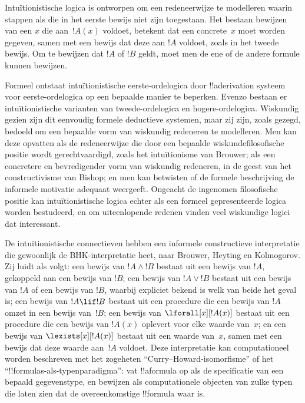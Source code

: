 \documentclass[../../../include/open-logic-section]{subfiles}
\begin{document}
Intuïtionistische logica is ontworpen om een redeneerwijze te modelleren waarin
stappen als die in het eerste bewijs niet zijn toegestaan. Het bestaan bewijzen
van een $x$ die aan~$!A(x)$ voldoet, betekent dat een concrete~$x$ moet worden
gegeven, samen met een bewijs dat deze aan $!A$ voldoet, zoals in het tweede
bewijs. Om te bewijzen dat $!A$ of $!B$ geldt, moet men de ene of de andere
formule kunnen bewijzen.

Formeel ontstaat intuïtionistische eerste-ordelogica door !!a{derivation} systeem
voor eerste-ordelogica op een bepaalde manier te beperken. Evenzo bestaan er
intuïtionistische varianten van tweede-ordelogica en hogere-ordelogica. Wiskundig
gezien zijn dit eenvoudig formele deductieve systemen, maar zij zijn, zoals
gezegd, bedoeld om een bepaalde vorm van wiskundig redeneren te modelleren. Men
kan deze opvatten als de redeneerwijze die door een bepaalde
wiskundefilosofische positie wordt gerechtvaardigd, zoals het intuïtionisme van
Brouwer; als een concretere en bevredigender vorm van wiskundig redeneren, in de
geest van het constructivisme van Bishop; en men kan betwisten of de formele
beschrijving de informele motivatie adequaat weergeeft. Ongeacht de ingenomen
filosofische positie kan intuïtionistische logica echter als een formeel
gepresenteerde logica worden bestudeerd, en om uiteenlopende redenen vinden veel
wiskundige logici dat interessant.

De intuïtionistische connectieven hebben een informele constructieve
interpretatie die gewoonlijk de BHK-interpretatie heet, naar Brouwer, Heyting en
Kolmogorov. Zij luidt als volgt: een bewijs van $!A \land !B$ bestaat uit een
bewijs van $!A$, gekoppeld aan een bewijs van $!B$; een bewijs van $!A \lor !B$
bestaat uit een bewijs van $!A$ of een bewijs van $!B$, waarbij expliciet bekend
is welk van beide het geval is; een bewijs van $!A \lif !B$ bestaat uit een
procedure die een bewijs van $!A$ omzet in een bewijs van~$!B$; een bewijs van
$\lforall[x][!A(x)]$ bestaat uit een procedure die een bewijs van $!A(x)$
oplevert voor elke waarde van~$x$; en een bewijs van $\lexists[x][!A(x)]$ bestaat uit
een waarde van~$x$, samen met een bewijs dat deze waarde aan~$!A$ voldoet. Deze
interpretatie kan computationeel worden beschreven met het zogeheten
``Curry--Howard-isomorfisme'' of het ``!!{formula}s-als-typenparadigma'': vat
!!a{formula} op als de specificatie van een bepaald gegevenstype, en bewijzen als
computationele objecten van zulke typen die laten zien dat de overeenkomstige
!!{formula} waar is.
\end{document}
